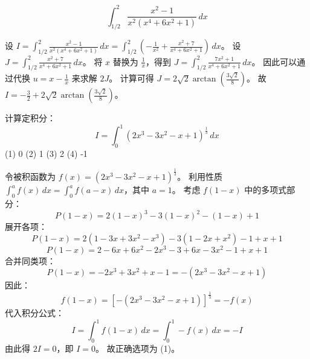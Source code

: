 \begin{questions}
    \question
\[
\int_{1/2}^2 \frac{x^2 - 1}{x^2(x^4 + 6x^2 + 1)} \,dx
\]
\begin{solution}
设 $I = \int_{1/2}^2 \frac{x^2 - 1}{x^2(x^4 + 6x^2 + 1)} \,dx = \int_{1/2}^2 \left(-\frac{1}{x^2} + \frac{x^2 + 7}{x^4 + 6x^2 + 1}\right) \,dx$。
设 $J = \int_{1/2}^2 \frac{x^2 + 7}{x^4 + 6x^2 + 1} \,dx$。
将 $x$ 替换为 $\frac{1}{x}$，得到 $J = \int_{1/2}^2 \frac{7x^2 + 1}{x^4 + 6x^2 + 1} \,dx$。
因此可以通过代换 $u = x - \frac{1}{x}$ 来求解 $2J$。
计算可得 $J = 2\sqrt{2}\arctan\left(\frac{3\sqrt{2}}{8}\right)$。
故 $I = -\frac{3}{2} + 2\sqrt{2}\arctan\left(\frac{3\sqrt{2}}{8}\right)$。
\end{solution}

\question
计算定积分：
\[ I = \int_{0}^{1} (2x^3 - 3x^2 - x + 1)^{\frac{1}{3}} \, dx \]
(1) 0 \quad (2) 1 \quad (3) 2 \quad (4) -1

\begin{solution}
令被积函数为 $f(x) = (2x^3 - 3x^2 - x + 1)^{\frac{1}{3}}$。
利用性质 $\int_{0}^{a} f(x) \, dx = \int_{0}^{a} f(a - x) \, dx$，其中 $a = 1$。
考虑 $f(1 - x)$ 中的多项式部分：
\[
P(1 - x) = 2(1 - x)^3 - 3(1 - x)^2 - (1 - x) + 1
\]
展开各项：
\[
P(1 - x) = 2(1 - 3x + 3x^2 - x^3) - 3(1 - 2x + x^2) - 1 + x + 1
\]
\[
P(1 - x) = 2 - 6x + 6x^2 - 2x^3 - 3 + 6x - 3x^2 - 1 + x + 1
\]
合并同类项：
\[
P(1 - x) = -2x^3 + 3x^2 + x - 1 = -(2x^3 - 3x^2 - x + 1)
\]
因此：
\[
f(1 - x) = [-(2x^3 - 3x^2 - x + 1)]^{\frac{1}{3}} = -f(x)
\]
代入积分公式：
\[
I = \int_{0}^{1} f(1 - x) \, dx = \int_{0}^{1} -f(x) \, dx = -I
\]
由此得 $2I = 0$，即 $I = 0$。
故正确选项为 (1)。
\end{solution}


\end{questions}
